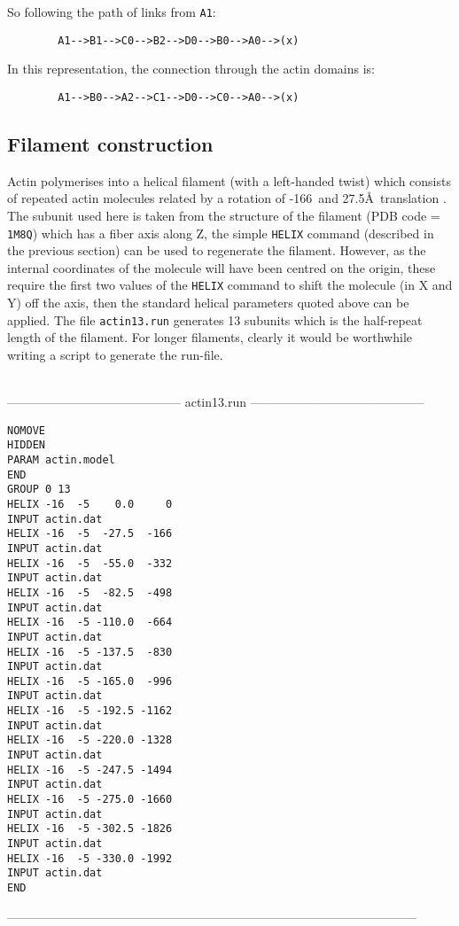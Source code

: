 So following the path of links from {\tt A1}:
\begin{verbatim}
        A1-->B1-->C0-->B2-->D0-->B0-->A0-->(x)
\end{verbatim}
In this representation, the connection through the actin domains is:
\begin{verbatim}
        A1-->B0-->A2-->C1-->D0-->C0-->A0-->(x)
\end{verbatim}


\subsection{Filament construction}

Actin polymerises into a helical filament (with a left-handed twist) which consists of
repeated actin molecules related by a rotation of -166\degre\ and 27.5\AA\ translation
\cite{HolmesKC09}.  The subunit used here is taken from the structure of the filament
(PDB code = {\tt 1M8Q}) which has a fiber axis along Z, the simple {\tt HELIX} command
(described in the previous section) can be used to regenerate the filament.  However,
as the internal coordinates of the molecule will have been centred on the origin,
these require the first two values of the {\tt HELIX} command to shift the molecule
(in X and Y) off the axis, then the standard helical parameters quoted above can be
applied.   The file {\tt actin13.run} generates 13 subunits which is the half-repeat
length of the filament.  For longer filaments, clearly it would be worthwhile writing
a script to generate the run-file.

\begin{singlespace}
\ \\
------------------------------------------
actin13.run
------------------------------------------
\begin{verbatim}
NOMOVE
HIDDEN
PARAM actin.model
END
GROUP 0 13
HELIX -16  -5    0.0     0
INPUT actin.dat
HELIX -16  -5  -27.5  -166
INPUT actin.dat
HELIX -16  -5  -55.0  -332
INPUT actin.dat
HELIX -16  -5  -82.5  -498
INPUT actin.dat
HELIX -16  -5 -110.0  -664
INPUT actin.dat
HELIX -16  -5 -137.5  -830
INPUT actin.dat
HELIX -16  -5 -165.0  -996
INPUT actin.dat
HELIX -16  -5 -192.5 -1162
INPUT actin.dat
HELIX -16  -5 -220.0 -1328
INPUT actin.dat
HELIX -16  -5 -247.5 -1494
INPUT actin.dat
HELIX -16  -5 -275.0 -1660
INPUT actin.dat
HELIX -16  -5 -302.5 -1826
INPUT actin.dat
HELIX -16  -5 -330.0 -1992
INPUT actin.dat
END
\end{verbatim}
---------------------------------------------------------------------------------------------------
\end{singlespace}
